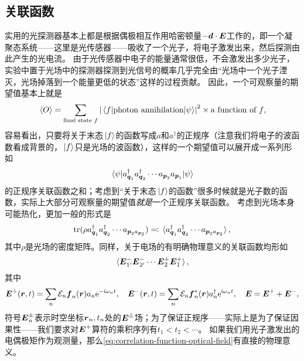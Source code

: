 \subsection{关联函数}

实用的光探测器基本上都是根据偶极相互作用哈密顿量$- \vb*{d} \cdot \vb*{E}$工作的，即一个凝聚态系统——这里是光传感器——吸收了一个光子，将电子激发出来，然后探测由此产生的光电流。
由于光传感器中电子的能量通常很低，不会激发出多少光子，实验中置于光场中的探测器探测到光信号的概率几乎完全由“光场中一个光子湮灭，光场掉落到一个能量更低的状态”这样的过程贡献。
因此，一个可观察量的期望值基本上就是
\[
    \expval*{O} = \sum_\text{final state $f$} \abs{\mel{f}{\text{photon annihilation}}{\psi}}^2 \times \text{a function of $f$},
\]
容易看出，只要将关于末态$\ket*{f}$的函数写成$a$和$a^\dagger$的正规序（注意我们将电子的波函数看成背景的，$\ket*{f}$只是光场的波函数），这样的一个期望值可以展开成一系列形如
\[
    \mel{\psi}{a^\dagger_{\vb*{q}_1} a^\dagger_{\vb*{q}_2} \cdots a_{\vb*{p}_2} a_{\vb*{p}_1}}{\psi}
\]
的正规序关联函数之和；考虑到“关于末态$\ket*{f}$的函数”很多时候就是光子数的函数，实际上大部分可观察量的期望值\emph{就是}一个正规序关联函数。
考虑到光场本身可能热化，更加一般的形式是
\[
    \trace(\rho a^\dagger_{\vb*{q}_1} a^\dagger_{\vb*{q}_2} \cdots a_{\vb*{p}_2 a_{\vb*{p}_2}}) \eqqcolon \expval*{a^\dagger_{\vb*{q}_1} a^\dagger_{\vb*{q}_2} \cdots a_{\vb*{p}_2 a_{\vb*{p}_2}}},
\]
其中$\rho$是光场的密度矩阵。同样，关于电场的有明确物理意义的关联函数均形如
\begin{equation}
    \expval*{\vb*{E}^-_{1'} \vb*{E}^-_{2'} \cdots \vb*{E}^+_2 \vb*{E}^+_1},
    \label{eq:correlation-function-optical-field}
\end{equation}
其中
\begin{equation}
    \vb*{E}^{+} (\vb*{r}, t) = \sum_n \mathcal{E}_n \vb*{f}_n(\vb*{r}) a_n \mathrm{e}^{-\mathrm{i} \omega_n t} , \quad \vb*{E}^{-} (\vb*{r}, t) = \sum_n \mathcal{E}_n \vb*{f}^*_n(\vb*{r}) a^\dagger_n \mathrm{e}^{\mathrm{i} \omega_n t}, \quad \vb*{E} = \vb*{E}^+ + \vb*{E}^-,
\end{equation}
符号$\vb*{E}^{\pm}_n$表示时空坐标$\vb*{r}_n, t_n$处的$\vb*{E}^\pm$场；为了保证正规序——实际上是为了保证因果性——我们要求对$\vb*{E}^+$算符的乘积序列有$t_1 < t_2 < \cdots$。
如果我们用光子激发出的电偶极矩作为观测量，那么\eqref{eq:correlation-function-optical-field}有直接的物理意义。

